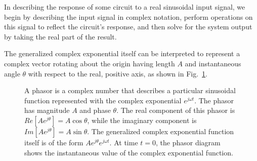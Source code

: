 \documentclass[11pt]{report}
\begin{document}
In describing the response of some circuit to a real sinusoidal input
signal, we begin by describing the input signal in complex notation,
perform operations on this signal to reflect the circuit's response, and
then solve for the system output by taking the real part of the
result.

The generalized complex exponential itself can be interpreted to
represent a complex vector rotating about the origin having length $A$
and instantaneous angle $\theta$ with respect to the real, positive
axis, as shown in Fig.~\ref{fig:phasor}.
\begin{figure}[h]
\centering
\epsfxsize=2.0in
\caption{A phasor is a complex number that describes a particular
sinusoidal function represented with the complex exponential
$e^{j\omega t}$.  The phasor has magnitude $A$ and phase $\theta$. The
real component of this phasor is $Re[Ae^{j\theta}] = A \cos\theta$,
while the imaginary component is $Im[Ae^{j\theta}] = A \sin\theta$.
The generalized complex exponential function itself is of the form
$Ae^{j\theta}e^{j\omega t}$. At time $t=0$, the phasor diagram shows
the instantaneous value of the complex exponential function.}
\label{fig:phasor}
\end{figure}
\end{document}
